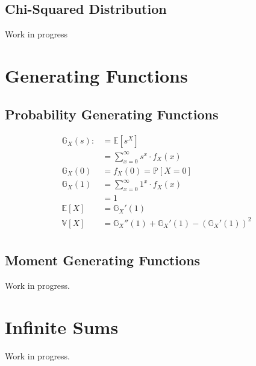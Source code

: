 \subsection{Chi-Squared Distribution}
Work in progress
\section{Generating Functions}
\subsection{Probability Generating Functions}
\begin{equation*}
    \begin{aligned}
        \mathbb{G}_X(s) :&= \mathbb{E}[s^X] \\
                         &= \sum_{x = 0}^\infty s^x \cdot f_X(x) \\
        \mathbb{G}_X(0)  &= f_X(0) = \mathbb{P}[X=0] \\
        \mathbb{G}_X(1)  &= \sum_{x = 0}^\infty 1^x \cdot f_X(x) \\
                         &= 1 \\
        \mathbb{E}[X] &= \mathbb{G}_X'(1)  \\
        \mathbb{V}[X] &= \mathbb{G}_X''(1) + \mathbb{G}_X'(1) - \left(\mathbb{G}_X'(1)\right)^2 \\
    \end{aligned}
\end{equation*}


\subsection{Moment Generating Functions}
Work in progress.
\section{Infinite Sums}
Work in progress.
